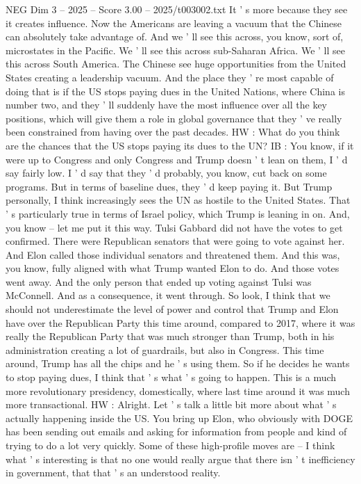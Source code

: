 \begin{textsample}{NEG Dim 3 – 2025 – Score 3.00 – 2025/t003002.txt}
It ' s more because they see it creates influence.
Now the Americans are leaving a vacuum that the Chinese can absolutely take advantage of.
And we ' ll see this across, you know, sort of, microstates in the Pacific.
We ' ll see this across sub-Saharan Africa.
We ' ll see this across South America.
The Chinese see huge opportunities from the United States creating a leadership vacuum.
And the place they ' re most capable of doing that is if the US stops paying dues in the United Nations, where China is number two, and they ' ll suddenly have the most influence over all the key positions, which will give them a role in global governance that they ' ve really been constrained from having over the past decades.
HW : What do you think are the chances that the US stops paying its dues to the UN?
IB : You know, if it were up to Congress and only Congress and Trump doesn ' t lean on them, I ' d say fairly low.
I ' d say that they ' d probably, you know, cut back on some programs.
But in terms of baseline dues, they ' d keep paying it.
But Trump personally, I think increasingly sees the UN as hostile to the United States.
That ' s particularly true in terms of Israel policy, which Trump is leaning in on.
And, you know -- let me put it this way.
Tulsi Gabbard did not have the votes to get confirmed.
There were Republican senators that were going to vote against her.
And Elon called those individual senators and threatened them.
And this was, you know, fully aligned with what Trump wanted Elon to do.
And those votes went away.
And the only person that ended up voting against Tulsi was McConnell.
And as a consequence, it went through.
So look, I think that we should not underestimate the level of power and control that Trump and Elon have over the Republican Party this time around, compared to 2017, where it was really the Republican Party that was much stronger than Trump, both in his administration creating a lot of guardrails, but also in Congress.
This time around, Trump has all the chips and he ' s using them.
So if he decides he wants to stop paying dues, I think that ' s what ' s going to happen.
This is a much more revolutionary presidency, domestically, where last time around it was much more transactional.
HW : Alright.
Let ' s talk a little bit more about what ' s actually happening inside the US.
You bring up Elon, who obviously with DOGE has been sending out emails and asking for information from people and kind of trying to do a lot very quickly.
Some of these high-profile moves are -- I think what ' s interesting is that no one would really argue that there isn ' t inefficiency in government, that that ' s an understood reality.

\end{textsample}
